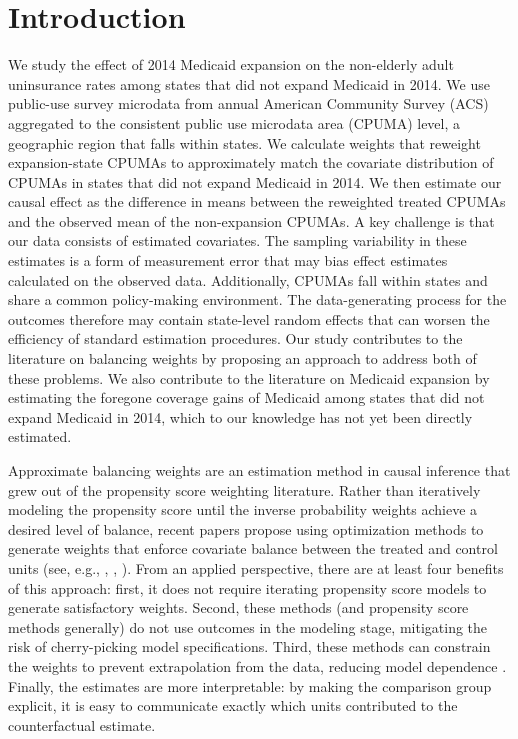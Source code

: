 \documentclass[aoas]{imsart}
\theoremstyle{plain}
\theoremstyle{remark}
\begin{document}
\section{Introduction}

We study the effect of 2014 Medicaid expansion on the non-elderly adult uninsurance rates among states that did not expand Medicaid in 2014. We use public-use survey microdata from annual American Community Survey (ACS) aggregated to the consistent public use microdata area (CPUMA) level, a geographic region that falls within states. We calculate weights that reweight expansion-state CPUMAs to approximately match the covariate distribution of CPUMAs in states that did not expand Medicaid in 2014. We then estimate our causal effect as the difference in means between the reweighted treated CPUMAs and the observed mean of the non-expansion CPUMAs. A key challenge is that our data consists of estimated covariates. The sampling variability in these estimates is a form of measurement error that may bias effect estimates calculated on the observed data. Additionally, CPUMAs fall within states and share a common policy-making environment. The data-generating process for the outcomes therefore may contain state-level random effects that can worsen the efficiency of standard estimation procedures. Our study contributes to the literature on balancing weights by proposing an approach to address both of these problems. We also contribute to the literature on Medicaid expansion by estimating the foregone coverage gains of Medicaid among states that did not expand Medicaid in 2014, which to our knowledge has not yet been directly estimated.

Approximate balancing weights are an estimation method in causal inference that grew out of the propensity score weighting literature. Rather than iteratively modeling the propensity score until the inverse probability weights achieve a desired level of balance, recent papers propose using optimization methods to generate weights that enforce covariate balance between the treated and control units (see, e.g., \cite{hainmueller2012entropy}, \cite{imai2014covariate}, \cite{zubizarreta2015stable}). From an applied perspective, there are at least four benefits of this approach: first, it does not require iterating propensity score models to generate satisfactory weights. Second, these methods (and propensity score methods generally) do not use outcomes in the modeling stage, mitigating the risk of cherry-picking model specifications. Third, these methods can constrain the weights to prevent extrapolation from the data, reducing model dependence \cite{zubizarreta2015stable}. Finally, the estimates are more interpretable: by making the comparison group explicit, it is easy to communicate exactly which units contributed to the counterfactual estimate.
\end{document}
